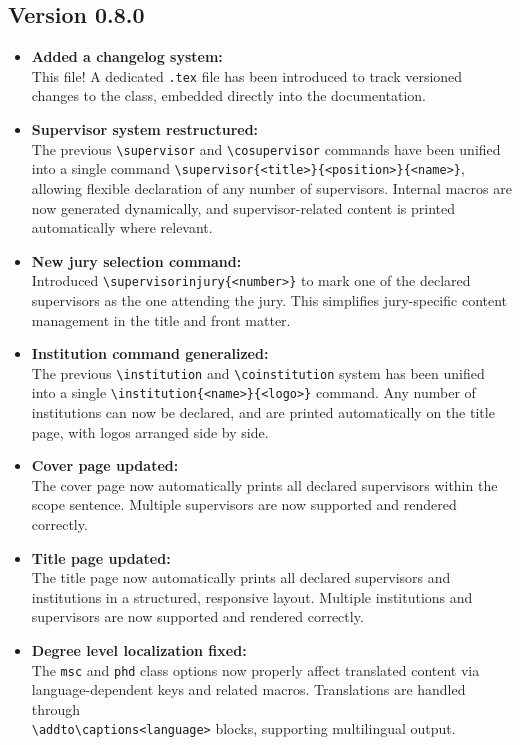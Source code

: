 \subsection{Version 0.8.0}
\begin{itemize}
\item \textbf{Added a changelog system:}\\ This file! A dedicated \texttt{.tex} file has been introduced to track versioned changes to the class, embedded directly into the documentation.
  
\item \textbf{Supervisor system restructured:}\\  
The previous \texttt{\textbackslash supervisor} and \texttt{\textbackslash cosupervisor} commands have been unified into a single command \texttt{\textbackslash supervisor\{<title>\}\{<position>\}\{<name>\}}, allowing flexible declaration of any number of supervisors. Internal macros are now generated dynamically, and supervisor-related content is printed automatically where relevant.

\item \textbf{New jury selection command:}\\  
Introduced \texttt{\textbackslash supervisorinjury\{<number>\}} to mark one of the declared supervisors as the one attending the jury. This simplifies jury-specific content management in the title and front matter.

\item \textbf{Institution command generalized:}\\  
The previous \texttt{\textbackslash institution} and \texttt{\textbackslash coinstitution} system has been unified into a single \texttt{\textbackslash institution\{<name>\}\{<logo>\}} command. Any number of institutions can now be declared, and are printed automatically on the title page, with logos arranged side by side.

\item \textbf{Cover page updated:}\\  
The cover page now automatically prints all declared supervisors within the scope sentence. Multiple supervisors are now supported and rendered correctly.

\item \textbf{Title page updated:}\\  
The title page now automatically prints all declared supervisors and institutions in a structured, responsive layout. Multiple institutions and supervisors are now supported and rendered correctly.

\item \textbf{Degree level localization fixed:}\\  
The \texttt{msc} and \texttt{phd} class options now properly affect translated content via language-dependent keys and related macros. Translations are handled through\\ \texttt{\textbackslash addto\textbackslash captions<language>} blocks, supporting multilingual output.
\end{itemize}
